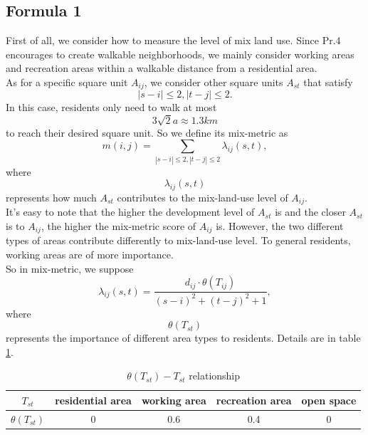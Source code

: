\subsection{Formula 1}
First of all, we consider how to measure the level of mix land use.
Since Pr.4 encourages to create walkable neighborhoods, we mainly consider working areas and recreation areas within a walkable distance from a residential area.
\\
As for a specific square unit $ A_{ij} $, we consider other square units $ A_{st}$ that satisfy $$ |s-i| \leq 2, |t-j| \leq 2. $$
In this case, residents only need to walk at most $$ 3 \sqrt{2} a \approx 1.3km $$ to reach their desired square unit.
So we define its mix-metric as $$ m(i,j) = \sum_{|s-i| \leq 2, |t-j| \leq 2} \lambda_{ij}(s,t), $$ where $$ \lambda_{ij}(s,t) $$ represents how much $ A_{st} $ contributes to the mix-land-use level of $ A_{ij} $.
\\
It's easy to note that the higher the development level of $ A_{st} $ is and the closer $ A_{st} $ is to $ A_{ij} $, the higher the mix-metric score of $ A_{ij} $ is.
However, the two different types of areas contribute differently to mix-land-use level.
To general residents, working areas are of more importance.
\\
So in mix-metric, we suppose $$ \lambda_{ij}(s,t) = \frac{d_{ij} \cdot \theta (T_{ij})}{(s-i)^2 + (t-j)^2 + 1}, $$ where $$ \theta (T_{st}) $$ represents the importance of different area types to residents. Details are in table \ref{tab:formula-1}.
\\
\begin{table}[tb]
\centering
  \begin{tabular}{c|cccc}
    \hline
    $ T_{st} $ & residential area & working area & recreation area & open space \\
    \hline
    $ \theta (T_{st}) $ & 0 & 0.6 & 0.4 & 0 \\
    \hline
  \end{tabular}
  \caption{$ \theta (T_{st}) - T_{st} $ relationship}
  \label{tab:formula-1}
\end{table}
